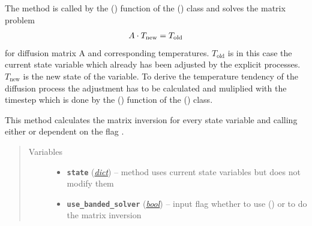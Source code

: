 \documentclass[a4paper,10pt,english]{sphinxmanual}
\begin{document}
\begin{fulllineitems}
\begin{fulllineitems}
The method is called by the 
{\hyperref[api/climlab.process:climlab.process.implicit.ImplicitProcess._compute]{\emph{}}} () function 
of the {\hyperref[api/climlab.process:climlab.process.implicit.ImplicitProcess]{\emph{}}} () class and 
solves the matrix problem
\begin{gather}
\begin{split}A \cdot T_{\textrm{new}} = T_{\textrm{old}}\end{split}\notag
\end{gather}
for diffusion matrix A and corresponding temperatures. 
\(T_{\textrm{old}}\) is in this case the current state variable 
which already has been adjusted by the explicit processes. 
\(T_{\textrm{new}}\) is the new state of the variable. To
derive the temperature tendency of the diffusion process the adjustment 
has to be calculated and muliplied with the timestep which is done by
the {\hyperref[api/climlab.process:climlab.process.implicit.ImplicitProcess._compute]{\emph{}}} () 
function of the {\hyperref[api/climlab.process:climlab.process.implicit.ImplicitProcess]{\emph{}}} () 
class.

This method calculates the matrix inversion for every state variable
and calling either  or 
\href{http://docs.scipy.org/doc/numpy/reference/generated/numpy.linalg.solve.html\#numpy.linalg.solve}{} dependent on the flag 
.
\begin{quote}\begin{description}
\item[{Variables}] \leavevmode\begin{itemize}
\item {} 
\textbf{\texttt{state}} (\href{http://docs.python.org/2.7/library/stdtypes.html\#dict}{\emph{dict}}) -- method uses current state variables
but does not modify them

\item {} 
\textbf{\texttt{use\_banded\_solver}} (\href{http://docs.python.org/2.7/library/functions.html\#bool}{\emph{bool}}) -- input flag whether to use 
{\hyperref[api/climlab.dynamics:climlab.dynamics.diffusion._solve_implicit_banded]{\emph{}}} () or 
\href{http://docs.scipy.org/doc/numpy/reference/generated/numpy.linalg.solve.html\#numpy.linalg.solve}{} to do 
the matrix inversion


\end{itemize}
\end{description}
\end{quote}
\end{fulllineitems}
\end{fulllineitems}
\end{document}

